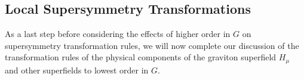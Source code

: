 
\subsection{Local Supersymmetry Transformations}

As a last step before considering the effects of higher order in \(G\) on
supersymmetry transformation rules, we will now complete our discussion
of the transformation rules of the physical components of the graviton
superfield \(H_\mu\) and other superfields to lowest order in \(G\).

